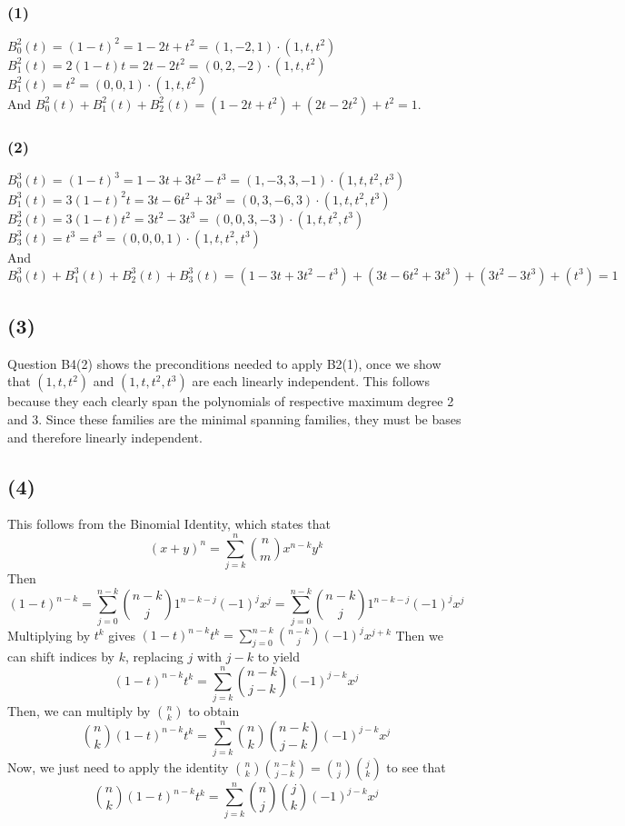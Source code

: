 \documentclass{article}
\begin{document}
\subsubsection{(1)}
$B^2_0(t) = (1-t)^2 = 1 - 2t + t^2 = (1,-2,1)\cdot(1, t, t^2)$\\
$B^2_1(t) = 2(1-t)t = 2t - 2t^2 = (0,2,-2)\cdot(1, t, t^2)$\\
$B^2_1(t) = t^2 = (0,0,1) \cdot(1,t,t^2)$\\
And $B^2_0(t) + B^2_1(t) + B^2_2(t) = (1 - 2t + t^2) + (2t - 2t^2) + t^2 = 1.$

\subsubsection{(2)}
$B^3_0(t) = (1-t)^3 = 1 - 3t + 3t^2 - t^3 = (1,-3,3,-1)\cdot(1, t, t^2,t^3)$\\
$B^3_1(t) = 3(1-t)^2t = 3t - 6t^2 + 3t^3 = (0,3,-6,3)\cdot(1, t, t^2,t^3)$\\
$B^3_2(t) = 3(1-t)t^2 = 3t^2 -3t^3 = (0,0,3,-3)\cdot(1, t, t^2,t^3)$\\
$B^3_3(t) = t^3 = t^3 = (0,0,0,1)\cdot(1, t, t^2,t^3)$\\
And $B^3_0(t) + B^3_1(t) + B^3_2(t) + B^3_3(t) = (1 - 3t + 3t^2 - t^3) + (3t -
6t^2 + 3t^3) + (3t^2 -3t^3) + (t^3) = 1$

\subsection{(3)}
Question B4(2) shows the preconditions needed to apply B2(1), once we show that
$(1,t,t^2)$ and $(1,t,t^2,t^3)$ are each linearly independent. This follows
because they each clearly span the polynomials of respective maximum degree 2
and 3. Since these families are the minimal spanning families, they must be
bases and therefore linearly independent.

\subsection{(4)}
This follows from the Binomial Identity, which states that
\[(x + y)^n = \sum_{j=k}^n \binom{n}{m}x^{n-k}y^k\]
Then 
\[(1-t)^{n-k} = \sum_{j=0}^{n-k}\binom{n-k}{j}1^{n-k-j}(-1)^jx^j =
\sum_{j=0}^{n-k}\binom{n-k}{j}1^{n-k-j}(-1)^jx^j \]
Multiplying by $t^k$ gives
$(1-t)^{n-k}t^k = \displaystyle{\sum_{j=0}^{n-k}
\binom{n-k}{j}(-1)^jx^{j+k}}$
Then we can shift indices by $k$, replacing $j$ with $j-k$ to yield
\[(1-t)^{n-k}t^k = \sum_{j=k}^{n} \binom{n-k}{j-k}(-1)^{j-k}x^j\]
Then, we can multiply by $\binom{n}{k}$ to obtain
\[\binom{n}{k}(1-t)^{n-k}t^k = \sum_{j=k}^{n} \binom{n}{k}\binom{n-k}{j-k}(-1)^{j-k}x^j\]
Now, we just need to apply the identity $\binom{n}{k}\binom{n-k}{j-k} =
\binom{n}{j}\binom{j}{k}$ to see that 
\[\binom{n}{k}(1-t)^{n-k}t^k = \sum_{j=k}^{n} \binom{n}{j}\binom{j}{k}(-1)^{j-k}x^j\]
\end{document}
